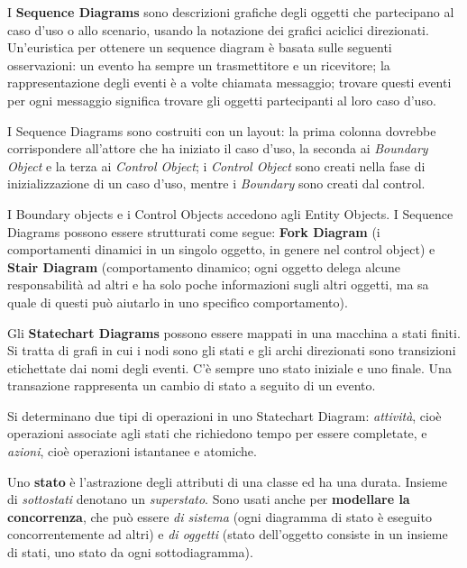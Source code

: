 \documentclass{article}
\begin{document}
        \vspace{3mm}
        
        I \textbf{Sequence Diagrams} sono descrizioni grafiche degli oggetti che partecipano al caso d’uso o allo scenario, usando la notazione dei grafici aciclici direzionati. Un’euristica per ottenere un sequence diagram è basata sulle seguenti osservazioni: un evento ha sempre un trasmettitore e un ricevitore; la rappresentazione degli eventi è a volte chiamata messaggio; trovare questi eventi per ogni messaggio significa trovare gli oggetti partecipanti al loro caso d’uso. 

        I Sequence Diagrams sono costruiti con un layout: la prima colonna dovrebbe corrispondere all’attore che ha iniziato il caso d’uso, la seconda ai \textit{Boundary Object} e la terza ai \textit{Control Object}; i \textit{Control Object} sono creati nella fase di inizializzazione di un caso d’uso, mentre i \textit{Boundary} sono creati dal control. 
        
        \vspace{3mm}
        
        I Boundary objects e i Control Objects accedono agli Entity Objects. I Sequence Diagrams possono essere strutturati come segue: \textbf{Fork Diagram} (i comportamenti dinamici in un singolo oggetto, in genere nel control object) e \textbf{Stair Diagram} (comportamento dinamico; ogni oggetto delega alcune responsabilità ad altri e ha solo poche informazioni sugli altri oggetti, ma sa quale di questi può aiutarlo in uno specifico comportamento).
        
        \vspace{3mm}
        
        Gli \textbf{Statechart Diagrams} possono essere mappati in una macchina a stati finiti. Si tratta di grafi in cui i nodi sono gli stati e gli archi direzionati sono transizioni etichettate dai nomi degli eventi. C’è sempre uno stato iniziale e uno finale. Una transazione rappresenta un cambio di stato a seguito di un evento. 
        
        Si determinano due tipi di operazioni in uno Statechart Diagram: \textit{attività}, cioè operazioni associate agli stati che richiedono tempo per essere completate, e \textit{azioni}, cioè operazioni istantanee e atomiche. 
        
        \vspace{3mm}
        
        Uno \textbf{stato} è l’astrazione degli attributi di una classe ed ha una durata. Insieme di \textit{sottostati} denotano un \textit{superstato}. Sono usati anche per \textbf{modellare la concorrenza}, che può essere \textit{di sistema} (ogni diagramma di stato è eseguito concorrentemente ad altri) e \textit{di oggetti} (stato dell’oggetto consiste in un insieme di stati, uno stato da ogni sottodiagramma). 
        
\end{document}

